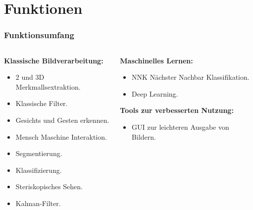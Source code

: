 \documentclass{beamer}
\begin{document}
\section{Funktionen}
\begin{frame} \frametitle{Funktionsumfang}
	\begin{columns}
		\begin{column}{0.5\textwidth}
			\textbf{Klassische Bildverarbeitung: }
			\begin{itemize}
				\item  2 und 3D Merkmallsextraktion.
				\item Klassische Filter.
				\item Gesichts und Gesten erkennen.
				\item Mensch Maschine Interaktion.
				\item Segmentierung.
				\item Klassifizierung.
				\item Steriskopisches Sehen.
				\item Kalman-Filter.
			\end{itemize}
		\end{column}
		\begin{column}{0.5\textwidth}
			\textbf{Maschinelles Lernen:}
			\begin{itemize}
				\item NNK Nächster Nachbar Klassifikation.
				\item Deep Learning.
			\end{itemize}
			\textbf{Tools zur verbesserten Nutzung:}
			\begin{itemize}
				\item GUI zur leichteren Ausgabe von Bildern.
			\end{itemize}
		\end{column}
	\end{columns}	
	\cite{Bradski2008}
\end{frame}
\end{document}
